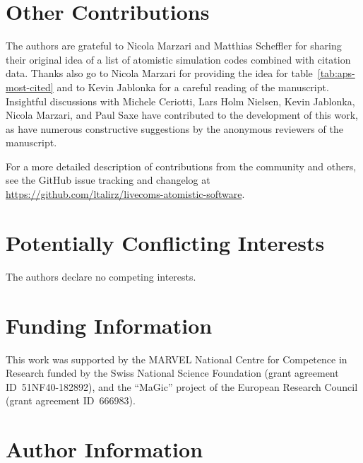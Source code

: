 \documentclass[9pt,review,pubversion]{livecoms}
\newcommand{\githubrepository}{\url{https://github.com/ltalirz/livecoms-atomistic-software}}  %
\begin{document}

\section*{Other Contributions}
%
The authors are grateful to Nicola Marzari and Matthias Scheffler for sharing their original idea of a list of atomistic simulation codes combined with citation data. 
Thanks also go to Nicola Marzari for providing the idea for table~\ref{tab:aps-most-cited} and to Kevin Jablonka for a careful reading of the manuscript.
Insightful discussions with Michele Ceriotti, Lars Holm Nielsen, Kevin Jablonka, Nicola Marzari, and Paul Saxe have contributed to the development of this work, as have numerous constructive suggestions by the anonymous reviewers of the manuscript.

For a more detailed description of contributions from the community and others, see the GitHub issue tracking and changelog at \githubrepository.

\section*{Potentially Conflicting Interests}
The authors declare no competing interests.

\section*{Funding Information}
This work was supported by the MARVEL National Centre for Competence in Research funded by the Swiss National Science Foundation (grant agreement ID~51NF40-182892), 
and the ``MaGic'' project of the European Research Council (grant agreement ID~666983).

\section*{Author Information}
\makeorcid




\end{document}

